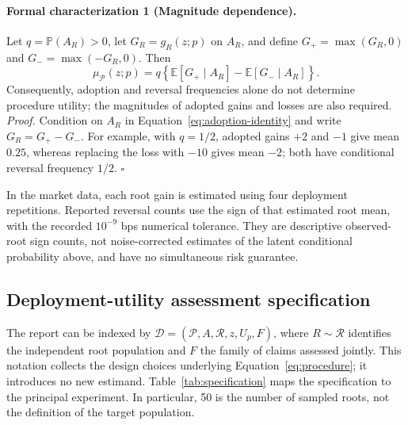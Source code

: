 \documentclass[10pt,letterpaper]{article}
\newcommand{\E}{\mathbb{E}}
\newcommand{\Prob}{\mathbb{P}}
\begin{document}
\paragraph{Formal characterization 1 (Magnitude dependence).}
Let $q=\Prob(A_R)>0$, let $G_R=g_R(z;p)$ on $A_R$, and define $G_+=\max(G_R,0)$ and $G_-=\max(-G_R,0)$. Then
\begin{equation}
\mu_{\mathcal P}(z;p)=q\left\{\E[G_+\mid A_R]-\E[G_-\mid A_R]\right\}.
\label{eq:magnitude-decomposition}
\end{equation}
Consequently, adoption and reversal frequencies alone do not determine procedure utility; the magnitudes of adopted gains and losses are also required. \emph{Proof.} Condition on $A_R$ in Equation~\ref{eq:adoption-identity} and write $G_R=G_+-G_-$. For example, with $q=1/2$, adopted gains $+2$ and $-1$ give mean $0.25$, whereas replacing the loss with $-10$ gives mean $-2$; both have conditional reversal frequency $1/2$. \hfill$\square$

In the market data, each root gain is estimated using four deployment repetitions. Reported reversal counts use the sign of that estimated root mean, with the recorded $10^{-9}$ bps numerical tolerance. They are descriptive observed-root sign counts, not noise-corrected estimates of the latent conditional probability above, and have no simultaneous risk guarantee.

\subsection{Deployment-utility assessment specification}
The report can be indexed by $\mathcal D=(\mathcal P,A,\mathcal R,z,U_p,F)$, where $R\sim\mathcal R$ identifies the independent root population and $F$ the family of claims assessed jointly. This notation collects the design choices underlying Equation~\ref{eq:procedure}; it introduces no new estimand. Table~\ref{tab:specification} maps the specification to the principal experiment. In particular, 50 is the number of sampled roots, not the definition of the target population.
\end{document}
